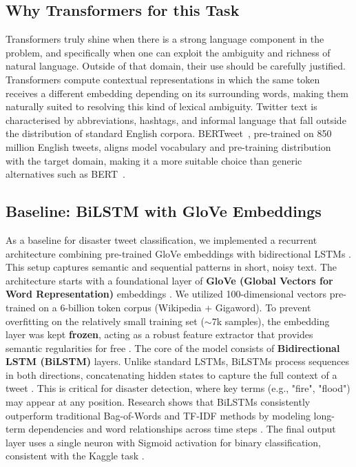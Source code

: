 \documentclass[conference]{IEEEtran}
\begin{document}
\subsection{Why Transformers for this Task}
Transformers truly shine when there is a strong language component in the problem, and specifically when one can exploit the ambiguity and richness of natural language. Outside of that domain, their use should be carefully justified. Transformers compute contextual representations in which the same token receives a different embedding depending on its surrounding words, making them naturally suited to resolving this kind of lexical ambiguity. Twitter text is characterised by abbreviations, hashtags, and informal language that fall outside the distribution of standard English corpora. BERTweet~\cite{nguyen2020bertweet}, pre-trained on 850 million English tweets, aligns model vocabulary and pre-training distribution with the target domain, making it a more suitable choice than generic alternatives such as BERT~\cite{devlin2019bert}.

\subsection{Baseline: BiLSTM with GloVe Embeddings}
As a baseline for disaster tweet classification, we implemented a recurrent architecture combining pre-trained GloVe \cite{nikjohn7_kaggle} embeddings with bidirectional LSTMs \cite{akashkr_kaggle}. This setup captures semantic and sequential patterns in short, noisy text. The architecture starts with a foundational layer of \textbf{GloVe (Global Vectors for Word Representation)} embeddings \cite{pennington2014glove}. We utilized 100-dimensional vectors pre-trained on a 6-billion token corpus (Wikipedia + Gigaword). To prevent overfitting on the relatively small training set ($\sim$7k samples), the embedding layer was kept \textbf{frozen}, acting as a robust feature extractor that provides semantic regularities for free \cite{akashkr_kaggle}. The core of the model consists of \textbf{Bidirectional LSTM (BiLSTM)} layers. Unlike standard LSTMs, BiLSTMs process sequences in both directions, concatenating hidden states to capture the full context of a tweet \cite{akashkr_kaggle}. This is critical for disaster detection, where key terms (e.g., "fire", "flood") may appear at any position. Research shows that BiLSTMs consistently outperform traditional Bag-of-Words and TF-IDF methods by modeling long-term dependencies and word relationships across time steps \cite{nikjohn7_kaggle}. The final output layer uses a single neuron with Sigmoid activation for binary classification, consistent with the Kaggle task \cite{kaggle}.
\end{document}

